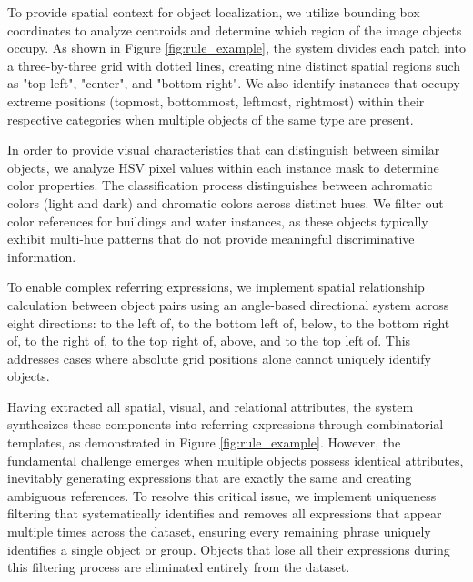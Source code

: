 To provide spatial context for object localization, we utilize bounding box coordinates to analyze centroids and determine which region of the image objects occupy. As shown in Figure \ref{fig:rule_example}, the system divides each patch into a three-by-three grid with dotted lines, creating nine distinct spatial regions such as "top left", "center", and "bottom right". We also identify instances that occupy extreme positions (topmost, bottommost, leftmost, rightmost) within their respective categories when multiple objects of the same type are present.

In order to provide visual characteristics that can distinguish between similar objects, we analyze HSV pixel values within each instance mask to determine color properties. The classification process distinguishes between achromatic colors (light and dark) and chromatic colors across distinct hues. We filter out color references for buildings and water instances, as these objects typically exhibit multi-hue patterns that do not provide meaningful discriminative information.

To enable complex referring expressions, we implement spatial relationship calculation between object pairs using an angle-based directional system across eight directions: to the left of, to the bottom left of, below, to the bottom right of, to the right of, to the top right of, above, and to the top left of. This addresses cases where absolute grid positions alone cannot uniquely identify objects.

Having extracted all spatial, visual, and relational attributes, the system synthesizes these components into referring expressions through combinatorial templates, as demonstrated in Figure \ref{fig:rule_example}. However, the fundamental challenge emerges when multiple objects possess identical attributes, inevitably generating expressions that are exactly the same and creating ambiguous references. To resolve this critical issue, we implement uniqueness filtering that systematically identifies and removes all expressions that appear multiple times across the dataset, ensuring every remaining phrase uniquely identifies a single object or group. Objects that lose all their expressions during this filtering process are eliminated entirely from the dataset.


